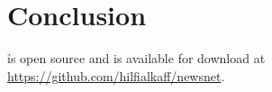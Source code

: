 \section{Conclusion}
\label{sec:conc}

\h is open source and is available for download at \url{https://github.com/hilfialkaff/newsnet}.
